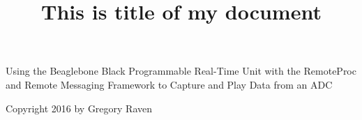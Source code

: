 \documentclass[oneside,letterpaper,12pt]{book}
\title{This is title of my document}
\begin{document}




%
\frontmatter
Using the Beaglebone Black Programmable Real-Time Unit with the RemoteProc and Remote Messaging Framework to Capture and Play Data from an ADC

Copyright 2016 by Gregory Raven
\tableofcontents
\listoftables
\listoffigures

\mainmatter














\backmatter
\end{document}
